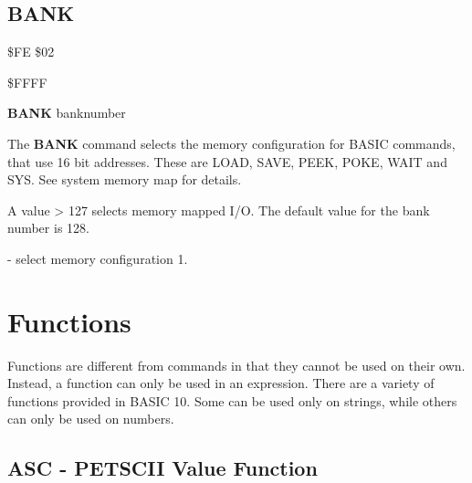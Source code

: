 
\subsection{BANK}

\begin{description}[leftmargin=3cm,style=nextline]
\item [Token:] \$FE \$02
\item [Address:] \$FFFF
\item [Format:] {\bf BANK} banknumber
\item [Usage:] The {\bf BANK} command selects the memory configuration
               for BASIC commands, that use 16 bit addresses.
               These are LOAD, SAVE, PEEK, POKE, WAIT and SYS.
               See system memory map for details.
\item [Remarks:] A value > 127 selects memory mapped I/O.
                 The default value for the bank number is 128.
\item [Example:]  - select memory configuration 1.
\end{description}

\newpage

%
%


\section{Functions}

Functions are different from commands in that they cannot be used on their own.
Instead, a function can only be used in an expression.
There are a variety of functions provided in BASIC 10.
Some can be used only on strings, while others can only be used on numbers.


\subsection{ASC - PETSCII Value Function}


